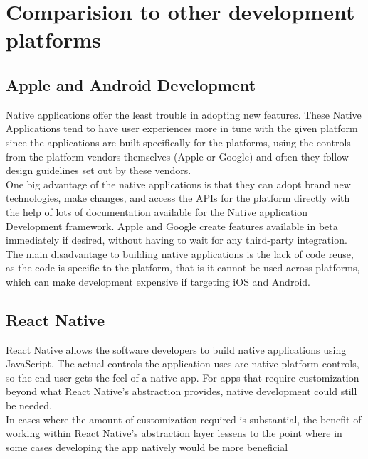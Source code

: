 \chapter{Comparision to other development platforms}




\section{Apple and Android Development}
Native applications offer the least trouble in adopting new features. These Native Applications tend to have user
experiences more in tune with the given platform since the applications are built specifically for the platforms, using the controls from
the platform vendors themselves (Apple or Google) and often they follow design guidelines set out by
these vendors.\\
One big advantage of the native applications is that they can adopt brand new technologies, make changes, and access the APIs for the platform directly with the help of lots of documentation available for the Native application Development framework. Apple
and Google create features available in beta immediately if desired, without having to wait for any third-party
integration. The main disadvantage to building native applications is the lack of code reuse, as the code is specific to the platform, that is it cannot be used across
platforms, which can make development expensive if targeting iOS and Android.

\section{React Native}
React Native allows the software developers to build native applications using JavaScript. The actual controls the
application uses are native platform controls, so the end user gets the feel of a native app. For apps
that require customization beyond what React Native’s abstraction provides, native development could
still be needed.\\ In cases where the amount of customization required is substantial, the benefit of
working within React Native’s abstraction layer lessens to the point where in some cases developing
the app natively would be more beneficial
